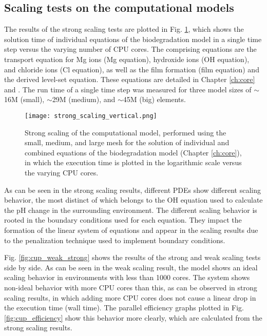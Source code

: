 \subsection{Scaling tests on the computational models}

The results of the strong scaling tests are plotted in Fig. \ref{fig:cup_strong_scaling}, which shows the solution time of individual equations of the biodegradation model in a single time step versus the varying number of \gls{CPU} cores. The comprising equations are the transport equation for Mg ions (Mg equation), hydroxide ions (OH equation), and chloride ions (Cl equation), as well as the film formation (film equation) and the derived level-set equation. These equations are detailed in Chapter \ref{ch:core} and \cite{Barzegari2021}. The run time of a single time step was measured for three model sizes of $\sim$16M (small), $\sim$29M (medium), and $\sim$45M (big) elements.

\begin{figure}[h]
\centering
\medskip
\texttt{[image: strong\_scaling\_vertical.png]}
\caption[Strong scaling of individual and combined components of the biodegradation model]{Strong scaling of the computational model, performed using the small, medium, and large mesh for the solution of individual and combined equations of the biodegradation model (Chapter \ref{ch:core}), in which the execution time is plotted in the logarithmic scale versus the varying \gls{CPU} cores.} \label{fig:cup_strong_scaling}
\end{figure}


As can be seen in the strong scaling results, different \gls{PDE}s show different scaling behavior, the most distinct of which belongs to the OH equation used to calculate the pH change in the surrounding environment. The different scaling behavior is rooted in the boundary conditions used for each equation. They impact the formation of the linear system of equations and appear in the scaling results due to the penalization technique used to implement boundary conditions.

Fig. \ref{fig:cup_weak_strong} shows the results of the strong and weak scaling tests side by side. As can be seen in the weak scaling result, the model shows an ideal scaling behavior in environments with less than \num{1000} cores. The system shows non-ideal behavior with more \gls{CPU} cores than this, as can be observed in strong scaling results, in which adding more \gls{CPU} cores does not cause a linear drop in the execution time (wall time). The parallel efficiency graphs plotted in Fig. \ref{fig:cup_efficiency} show this behavior more clearly, which are calculated from the strong scaling results.

